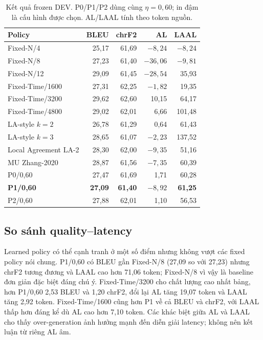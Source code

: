 \documentclass[conference]{IEEEtran}
\begin{document}
\begin{table}[t]
\caption{Kết quả frozen DEV. P0/P1/P2 dùng cùng $\eta=0{,}60$; in đậm là cấu hình được chọn. AL/LAAL tính theo token nguồn.}
\label{tab:results}
\centering
\scriptsize
\setlength{\tabcolsep}{3.2pt}
\begin{tabular}{lrrrr}
\toprule
Policy & BLEU & chrF2 & AL & LAAL \\
\midrule
Fixed-N/4 & 25,17 & 61,69 & $-8,24$ & $-8,24$ \\
Fixed-N/8 & 27,23 & 61,40 & $-36,06$ & $-9,81$ \\
Fixed-N/12 & 29,09 & 61,45 & $-28,54$ & 35,93 \\
Fixed-Time/1600 & 27,31 & 62,25 & $-1,82$ & 19,35 \\
Fixed-Time/3200 & 29,62 & 62,60 & 10,15 & 64,17 \\
Fixed-Time/4800 & 29,02 & 62,01 & 6,66 & 101,48 \\
LA-style $k=2$ & 26,78 & 61,29 & 0,64 & 61,43 \\
LA-style $k=3$ & 28,65 & 61,07 & $-2,23$ & 137,52 \\
Local Agreement LA-2 & 28,30 & 62,00 & $-9,35$ & 51,16 \\
MU Zhang-2020 & 28,87 & 61,56 & $-7,35$ & 60,39 \\
P0/0,60 & 27,47 & 61,69 & 1,71 & 60,28 \\
\textbf{P1/0,60} & \textbf{27,09} & \textbf{61,40} & \textbf{$-8,92$} & \textbf{61,25} \\
P2/0,60 & 27,88 & 62,01 & 1,10 & 56,53 \\
\bottomrule
\end{tabular}
\end{table}

\subsection{So sánh quality--latency}
Learned policy có thể cạnh tranh ở một số điểm nhưng không vượt các fixed policy nói chung. P1/0,60 có BLEU gần Fixed-N/8 (27,09 so với 27,23) nhưng chrF2 tương đương và LAAL cao hơn 71,06 token; Fixed-N/8 vì vậy là baseline đơn giản đặc biệt đáng chú ý. Fixed-Time/3200 cho chất lượng cao nhất bảng, hơn P1/0,60 2,53 BLEU và 1,20 chrF2, đổi lại AL tăng 19,07 token và LAAL tăng 2,92 token. Fixed-Time/1600 cũng hơn P1 về cả BLEU và chrF2, với LAAL thấp hơn đáng kể dù AL cao hơn 7,10 token. Các khác biệt giữa AL và LAAL cho thấy over-generation ảnh hưởng mạnh đến diễn giải latency; không nên kết luận từ riêng AL âm.
\end{document}
